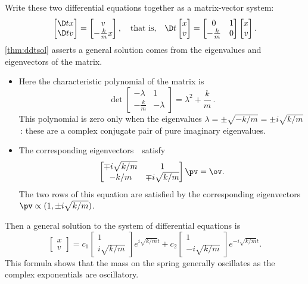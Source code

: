\begin{example}
\begin{solution}
Write these two differential equations together as a matrix-vector system: 
\begin{equation*}
\begin{bmatrix} \D tx\\\D tv \end{bmatrix}
=\begin{bmatrix} v\\-\frac kmx \end{bmatrix},
\quad\text{that is,}\quad
\D t{}\begin{bmatrix} x\\v \end{bmatrix}
=\begin{bmatrix} 0&1\\-\frac km&0 \end{bmatrix}\begin{bmatrix} x\\v \end{bmatrix}.
\end{equation*}
\autoref{thm:ddtsol} asserts a general solution comes from the eigenvalues and eigenvectors of the matrix.
\begin{itemize}
\item Here the characteristic polynomial of the matrix is
\begin{equation*}
\det\begin{bmatrix} -\lambda&1\\-\frac km&-\lambda \end{bmatrix}
=\lambda^2+\frac km\,.
\end{equation*}
This polynomial is zero only when the eigenvalues \(\lambda=\pm\sqrt{-k/m}=\pm i\sqrt{k/m}\)\,: these are a complex conjugate pair of pure imaginary eigenvalues.

\item  The corresponding eigenvectors~\pv\ satisfy
\begin{equation*}
\begin{bmatrix} \mp i\sqrt{k/m}&1\\- k/m&\mp i\sqrt{k/m} \end{bmatrix}
\pv=\ov.
\end{equation*}
The two rows of this equation are satisfied by the corresponding eigenvectors \(\pv\propto (1,\pm i\sqrt{k/m})\).
\end{itemize}
Then a general solution to the system of differential equations is
\begin{equation*}
\begin{bmatrix} x\\v \end{bmatrix}
=c_1\begin{bmatrix} 1\\i\sqrt{k/m} \end{bmatrix}e^{i\sqrt{k/m}t}
+c_2\begin{bmatrix} 1\\-i\sqrt{k/m} \end{bmatrix}e^{-i\sqrt{k/m}t}.
\end{equation*}
This formula shows that the mass on the spring generally oscillates as the complex exponentials are oscillatory.


\end{solution}
\end{example}
